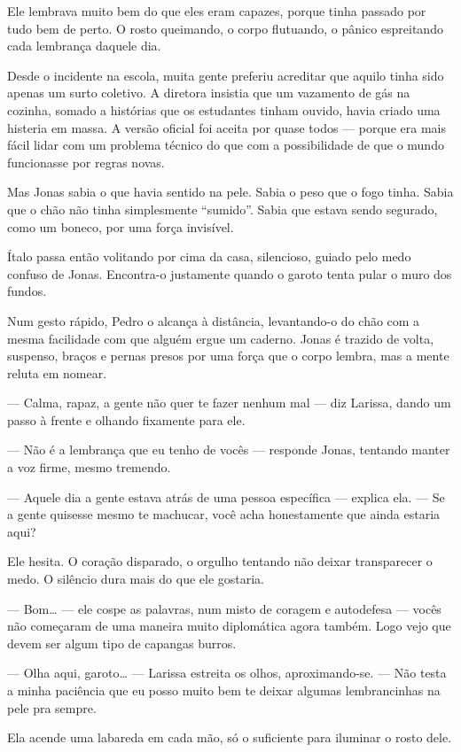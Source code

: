 Ele lembrava muito bem do que eles eram capazes, porque tinha passado por tudo bem de perto.  
O rosto queimando, o corpo flutuando, o pânico espreitando cada lembrança daquele dia.

Desde o incidente na escola, muita gente preferiu acreditar que aquilo tinha sido apenas um surto coletivo.  
A diretora insistia que um vazamento de gás na cozinha, somado a histórias que os estudantes tinham ouvido, havia criado uma histeria em massa.
A versão oficial foi aceita por quase todos — porque era mais fácil lidar com um problema técnico do que com a possibilidade de que o mundo funcionasse por regras novas.

Mas Jonas sabia o que havia sentido na pele.  
Sabia o peso que o fogo tinha.  
Sabia que o chão não tinha simplesmente “sumido”.  
Sabia que estava sendo segurado, como um boneco, por uma força invisível.

Ítalo passa então volitando por cima da casa, silencioso, guiado pelo medo confuso de Jonas.  
Encontra-o justamente quando o garoto tenta pular o muro dos fundos.

Num gesto rápido, Pedro o alcança à distância, levantando-o do chão com a mesma facilidade com que alguém ergue um caderno.  
Jonas é trazido de volta, suspenso, braços e pernas presos por uma força que o corpo lembra, mas a mente reluta em nomear.

— Calma, rapaz, a gente não quer te fazer nenhum mal — diz Larissa, dando um passo à frente e olhando fixamente para ele.

— Não é a lembrança que eu tenho de vocês — responde Jonas, tentando manter a voz firme, mesmo tremendo.

— Aquele dia a gente estava atrás de uma pessoa específica — explica ela. — Se a gente quisesse mesmo te machucar, você acha honestamente que ainda estaria aqui?

Ele hesita.  
O coração disparado, o orgulho tentando não deixar transparecer o medo.
O silêncio dura mais do que ele gostaria.

— Bom… — ele cospe as palavras, num misto de coragem e autodefesa — vocês não começaram de uma maneira muito diplomática agora também. Logo vejo que devem ser algum tipo de capangas burros.

— Olha aqui, garoto… — Larissa estreita os olhos, aproximando-se. — Não testa a minha paciência que eu posso muito bem te deixar algumas lembrancinhas na pele pra sempre.

Ela acende uma labareda em cada mão, só o suficiente para iluminar o rosto dele.

